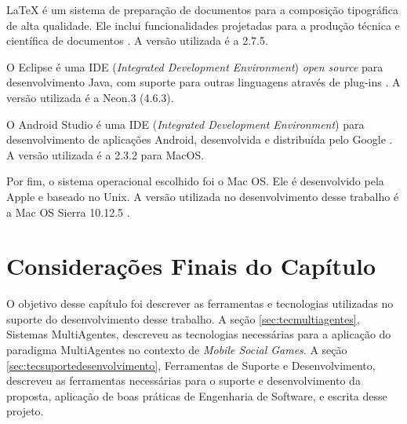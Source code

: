 LaTeX é um sistema de preparação de documentos para a composição tipográfica de
alta qualidade. Ele inclui funcionalidades projetadas para a produção técnica e
científica de documentos \cite{latex}. A versão utilizada é a 2.7.5.

O Eclipse é uma IDE (\textit{Integrated Development Environment})
\textit{open source} para desenvolvimento Java, com suporte para outras linguagens
através de plug-ins \cite{eclipse}. A versão utilizada é a Neon.3 (4.6.3).

O Android Studio é uma IDE (\textit{Integrated Development Environment}) para
desenvolvimento de aplicações Android, desenvolvida e distribuída pelo Google
\cite{androidStudio}. A versão utilizada é a 2.3.2 para MacOS.

Por fim, o sistema operacional escolhido foi o Mac OS. Ele é desenvolvido pela Apple e baseado no Unix. A versão utilizada no desenvolvimento desse trabalho é a Mac OS Sierra 10.12.5 \cite{macos}.

\section{Considerações Finais do Capítulo}

O objetivo desse capítulo foi descrever as ferramentas e tecnologias utilizadas
no suporte do desenvolvimento desse trabalho. A seção \ref{sec:tecmultiagentes},
Sistemas MultiAgentes, descreveu as tecnologias necessárias para a aplicação do
paradigma MultiAgentes no contexto de \textit{Mobile Social Games}. A seção
\ref{sec:tecsuportedesenvolvimento}, Ferramentas de Suporte e Desenvolvimento,
descreveu as ferramentas necessárias para o suporte e desenvolvimento da
proposta, aplicação de boas práticas de Engenharia de Software, e escrita desse
projeto.
